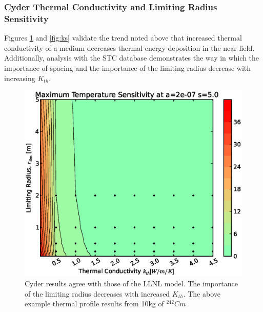 \begin{frame}[ctb!]
\frametitle{Cyder Thermal Conductivity and Limiting Radius Sensitivity}

Figures \ref{fig:kr} and \ref{fig:ks} validate the trend noted above that 
increased thermal conductivity of a medium decreases thermal energy deposition 
in the near field. Additionally, analysis with the \Cyder STC database 
demonstrates the way in which the importance of spacing and the importance of 
the limiting radius decrease with increasing $K_{th}$.

\begin{figure}[htbp!]
\begin{center}
\includegraphics[height=0.7\textheight]{./thermal_demonstration/conductivity/kr.eps}
\end{center}
\caption[$K_{th}$ vs. $r_{lim}$ Sensitivity in Cyder]
{Cyder results agree with 
those of the LLNL model. The importance of the limiting radius decreases with 
increased $K_{th}$. The above example thermal profile results from 10kg of 
$^{242}Cm$}
\label{fig:kr}
\end{figure}
\end{frame}


